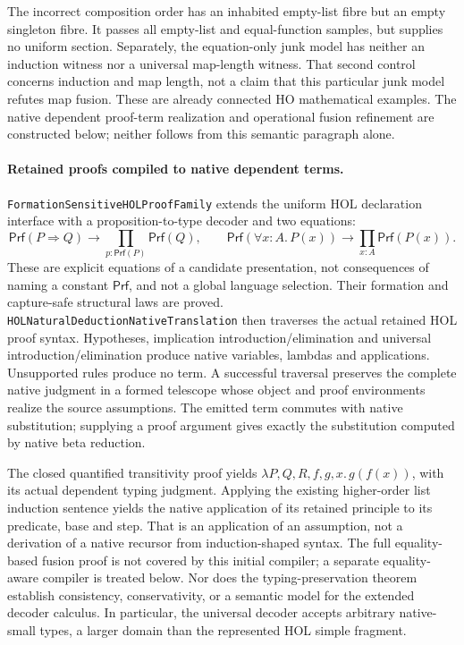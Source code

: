 \documentclass[11pt]{article}
\theoremstyle{definition}
\theoremstyle{remark}
\begin{document}
The incorrect composition order has an inhabited empty-list fibre but an
empty singleton fibre. It passes all empty-list and equal-function samples,
but supplies no uniform section. Separately, the equation-only junk model
has neither an induction witness nor a universal map-length witness. That
second control concerns induction and map length, not a claim that this
particular junk model refutes map fusion. These are already connected HO
mathematical examples. The native dependent proof-term realization and
operational fusion refinement are constructed below; neither follows from
this semantic paragraph alone.

\paragraph{Retained proofs compiled to native dependent terms.}
\nolinkurl{FormationSensitiveHOLProofFamily} extends the uniform HOL
declaration interface with a proposition-to-type decoder and two equations:
\[
 \mathsf{Prf}(P\Rightarrow Q)\longrightarrow
     \prod_{p:\mathsf{Prf}(P)}\mathsf{Prf}(Q),\qquad
 \mathsf{Prf}(\forall x:A.\,P(x))\longrightarrow
     \prod_{x:A}\mathsf{Prf}(P(x)).
\]
These are explicit equations of a candidate presentation, not consequences
of naming a constant \(\mathsf{Prf}\), and not a global language selection.
Their formation and capture-safe structural laws are proved.
\nolinkurl{HOLNaturalDeductionNativeTranslation} then traverses the actual
retained HOL proof syntax. Hypotheses, implication introduction/elimination
and universal introduction/elimination produce native variables, lambdas
and applications. Unsupported rules produce no term. A successful traversal
preserves the complete native judgment in a formed telescope whose object
and proof environments realize the source assumptions. The emitted term
commutes with native substitution; supplying a proof argument gives exactly
the substitution computed by native beta reduction.

The closed quantified transitivity proof yields
\(\lambda P,Q,R,f,g,x.\,g(f(x))\), with its actual dependent typing
judgment. Applying the existing higher-order list induction sentence yields
the native application of its retained principle to its predicate, base and
step. That is an application of an assumption, not a derivation of a native
recursor from induction-shaped syntax. The full equality-based fusion proof
is not covered by this initial compiler; a separate equality-aware compiler
is treated below. Nor does the typing-preservation theorem
establish consistency, conservativity, or a semantic model for the extended
decoder calculus. In particular, the universal decoder accepts arbitrary
native-small types, a larger domain than the represented HOL simple fragment.
\end{document}
